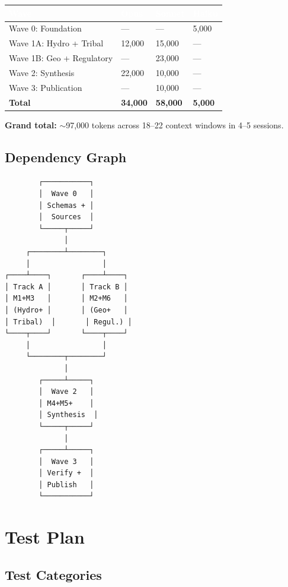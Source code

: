 \documentclass[11pt,letterpaper]{article}
\newcommand{\tableheader}[1]{\textbf{\sffamily\textcolor{white}{#1}}}
\begin{document}
\begin{center}
\begin{tabularx}{\textwidth}{L{4cm}C{2cm}C{2cm}C{2cm}}
\toprule
{}
\tableheader{Wave} & \tableheader{Opus} & \tableheader{Sonnet} & \tableheader{Haiku} \\
\midrule
Wave 0: Foundation & --- & --- & 5,000 \\
Wave 1A: Hydro + Tribal & 12,000 & 15,000 & --- \\
Wave 1B: Geo + Regulatory & --- & 23,000 & --- \\
Wave 2: Synthesis & 22,000 & 10,000 & --- \\
Wave 3: Publication & --- & 10,000 & --- \\
\midrule
\textbf{Total} & \textbf{34,000} & \textbf{58,000} & \textbf{5,000} \\
\bottomrule
\end{tabularx}
\end{center}

\textbf{Grand total:} $\sim$97,000 tokens across 18--22 context windows in 4--5 sessions.

\subsection{Dependency Graph}

\begin{asciibox}
\begin{verbatim}
        ┌───────────┐
        │  Wave 0   │
        │ Schemas + │
        │  Sources  │
        └─────┬─────┘
              │
     ┌────────┴────────┐
     │                 │
┌────┴────┐       ┌────┴────┐
│ Track A │       │ Track B │
│ M1+M3   │       │ M2+M6   │
│ (Hydro+ │       │ (Geo+   │
│ Tribal)  │       │ Regul.) │
└────┬────┘       └────┬────┘
     │                 │
     └────────┬────────┘
              │
        ┌─────┴─────┐
        │  Wave 2   │
        │ M4+M5+    │
        │ Synthesis  │
        └─────┬─────┘
              │
        ┌─────┴─────┐
        │  Wave 3   │
        │ Verify +  │
        │ Publish   │
        └───────────┘
\end{verbatim}
\end{asciibox}

\section{Test Plan}

\subsection{Test Categories}
\end{document}
